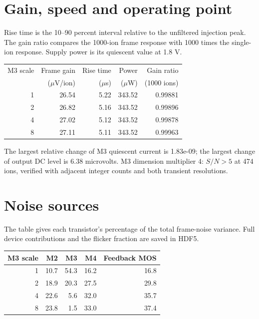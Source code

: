 \documentclass[11pt,a4paper]{article}
\begin{document}
\section*{Gain, speed and operating point}
Rise time is the 10--90 percent interval relative to the unfiltered injection
peak. The gain ratio compares the 1000-ion frame response with 1000 times the
single-ion response. Supply power is its quiescent value at 1.8 V.
\begin{center}\begin{tabular}{rrrrr}\toprule
M3 scale & Frame gain & Rise time & Power & Gain ratio\\
 & ($\mu$V/ion) & ($\mu$s) & ($\mu$W) & (1000 ions)\\\midrule
1 & 26.54 & 5.22 & 343.52 & 0.99881 \\
2 & 26.82 & 5.16 & 343.52 & 0.99896 \\
4 & 27.02 & 5.12 & 343.52 & 0.99878 \\
8 & 27.11 & 5.11 & 343.52 & 0.99963 \\
\bottomrule\end{tabular}\end{center}
The largest relative change of M3 quiescent current is 1.83e-09; the largest
change of output DC level is 6.38 microvolts.
M3 dimension multiplier 4: $S/N>5$ at 474 ions, verified with adjacent integer counts and both transient resolutions.

\section*{Noise sources}
The table gives each transistor's percentage of the total frame-noise variance.
Full device contributions and the flicker fraction are saved in HDF5.
\begin{center}\begin{tabular}{rrrrr}\toprule
M3 scale & M2 & M3 & M4 & Feedback MOS\\\midrule
1 & 10.7 & 54.3 & 16.2 & 16.8 \\
2 & 18.9 & 20.3 & 27.5 & 29.8 \\
4 & 22.6 & 5.6 & 32.0 & 35.7 \\
8 & 23.8 & 1.5 & 33.0 & 37.4 \\
\bottomrule\end{tabular}\end{center}
\end{document}
